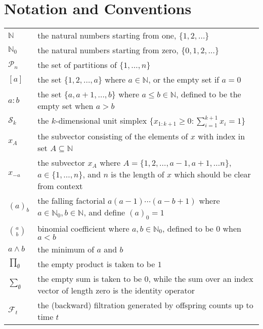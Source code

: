 \documentclass[oneside]{scrbook} %
\newcommand{\seb}[1]{\xspace\textcolor{red}{#1}\xspace} %
\theoremstyle{definition}
\newcommand{\1}[1]{\mathbbm{1}_{#1}} %
\begin{document}
\chapter{Notation and Conventions}

\begin{longtable}{p{} p{}}
$\mathbb{N}$ & the natural numbers starting from one, $\{1,2,\dots \}$ \\
$\mathbb{N}_0$ & the natural numbers starting from zero, $\{0,1,2,\dots \}$ \\
$\mathcal{P}_n$ & the set of partitions of $\{1,\dots,n\}$ \\
$[a]$ & the set $\{1,2,\dots,a\}$ where $a\in\mathbb{N}$, or the empty set if $a=0$ \\
$a:b$ & the set $\{a,a+1,\dots,b\}$ where $a \leq b \in\mathbb{N}$, defined to be the empty set when $a>b$ \\
$\mathcal{S}_k$ & the $k$-dimensional unit simplex $\{ x_{1:k+1} \geq 0 : \sum_{i=1}^{k+1} x_i = 1 \}$ \\
$x_A$ & the subvector consisting of the elements of $x$ with index in set $A\subseteq\mathbb{N}$ \\
$x_{-a}$ & the subvector $x_A$ where $A = \{1,2, \dots, a-1, a+1, \dots n\}$, $a\in\{1,\dots,n\}$, and $n$ is the length of $x$ which should be clear from context \\
$(a)_b$ & the falling factorial $a (a-1) \cdots (a-b+1)$ 
    where $a \in \mathbb{N}_0, b \in \mathbb{N}$, and define $(a)_0 = 1$ \\ 
$\binom{a}{b}$ & binomial coefficient where $a,b \in \mathbb{N}_0$, defined to be $0$ when $a<b$ \\
$a \wedge b$ & the minimum of $a$ and $b$ \\
$\prod_{\emptyset}$ & the empty product is taken to be $1$ \\
$\sum_{\emptyset}$ & the empty sum is taken to be $0$, while the sum over
    an index vector of length zero is the identity operator \\
$\mathcal{F}_{t}$ & the (backward) filtration generated by offspring counts 
    up to time $t$ \\

\end{longtable}
\end{document}
